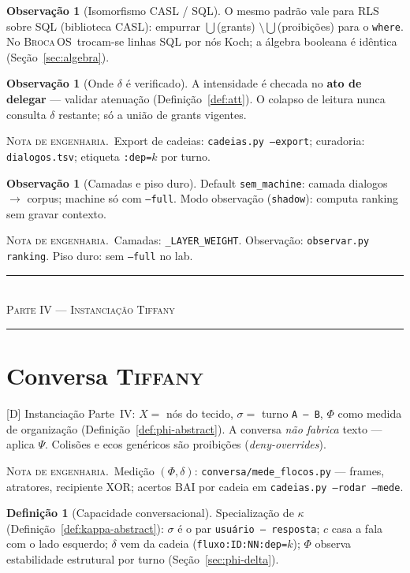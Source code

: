 \documentclass[11pt]{article}
\newcommand{\est}[1]{\textsf{\footnotesize[#1]}}
\newcommand{\SO}{\textsc{Broca\,OS}}
\newcommand{\Tiffany}{\textsc{Tiffany}}
\theoremstyle{definition}
\newtheorem{definition}[theorem]{Definição}
\newtheorem{remark}[theorem]{Observação}
\newcommand{\eng}[1]{\begin{engimpl}\small\textsc{Nota de engenharia.}\ #1\end{engimpl}}
\newcommand{\dep}{\delta}
\newcommand{\Phif}{\Phi}
\newcommand{\parttitle}[1]{%
  \clearpage
  \vspace*{0.5em}
  \begin{center}
  {\color{ourovivo}\rule{2.4cm}{0.5pt}}\\[6pt]
  {\fontsize{15}{18}\selectfont\scshape\color{ouro}#1}\\[6pt]
  {\color{prata}\rule{2.4cm}{0.5pt}}
  \end{center}
  \vspace{1.2em}
}
\begin{document}
\begin{remark}[Isomorfismo CASL / SQL]
O mesmo padrão vale para RLS sobre SQL (biblioteca CASL): empurrar
$\bigcup$(grants) $\setminus\bigcup$(proibições) para o \texttt{where}. No
\SO\ trocam-se linhas SQL por nós Koch; a álgebra booleana é idêntica
(Seção~\ref{sec:algebra}).
\end{remark}

\begin{remark}[Onde $\dep$ é verificado]
A intensidade é checada no \textbf{ato de delegar} --- validar atenuação
(Definição~\ref{def:att}). O colapso de leitura nunca consulta $\dep$
restante; só a união de grants vigentes.
\end{remark}

\eng{Export de cadeias: \texttt{cadeias.py --export}; curadoria:
\texttt{dialogos.tsv}; etiqueta \texttt{:dep=$k$} por turno.}

\begin{remark}[Camadas e piso duro]
Default \texttt{sem\_machine}: camada dialogos $\to$ corpus; machine só com
\texttt{--full}. Modo observação (\texttt{shadow}): computa ranking sem
gravar contexto.
\end{remark}

\eng{Camadas: \texttt{\_LAYER\_WEIGHT}. Observação:
\texttt{observar.py ranking}. Piso duro: sem \texttt{--full} no lab.}

\parttitle{Parte IV --- Instanciação \Tiffany}

  \section{Conversa \Tiffany}\label{sec:tiffany}

  \est{D} Instanciação Parte~IV: $X=$ nós do tecido, $\sigma=$ turno
  \texttt{A — B}, $\Phif$ como medida de organização (Definição~\ref{def:phi-abstract}).
  A conversa \emph{não fabrica} texto --- aplica $\Psi$.
  Colisões e ecos genéricos são proibições (\emph{deny-overrides}).

  \eng{Medição $(\Phif,\dep)$: \texttt{conversa/mede\_flocos.py} --- frames,
  atratores, recipiente XOR; acertos BAI por cadeia em
  \texttt{cadeias.py --rodar --mede}.}

  \begin{definition}[Capacidade conversacional]\label{def:kappa-tiffany}
  Specialização de $\kappa$ (Definição~\ref{def:kappa-abstract}): $\sigma$ é
  o par \texttt{usuário — resposta}; $c$ casa a fala com o lado esquerdo;
  $\dep$ vem da cadeia (\texttt{fluxo:ID:NN:dep=$k$}); $\Phif$ observa
  estabilidade estrutural por turno (Seção~\ref{sec:phi-delta}).
  \end{definition}
\end{document}
